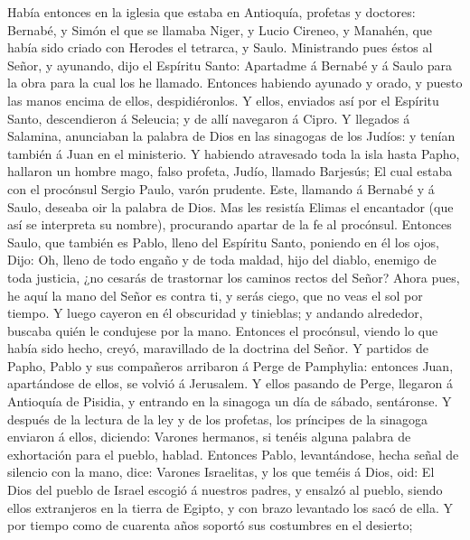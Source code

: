  Había entonces en la iglesia que estaba en Antioquía,
profetas y doctores: Bernabé, y Simón el que se llamaba Niger, y Lucio
Cireneo, y Manahén, que había sido criado con Herodes el tetrarca, y
Saulo.  Ministrando pues éstos al Señor, y ayunando, dijo
el Espíritu Santo: Apartadme á Bernabé y á Saulo para la obra para la
cual los he llamado.  Entonces habiendo ayunado y orado, y
puesto las manos encima de ellos, despidiéronlos.  Y
ellos, enviados así por el Espíritu Santo, descendieron á Seleucia; y de
allí navegaron á Cipro.  Y llegados á Salamina, anunciaban
la palabra de Dios en las sinagogas de los Judíos: y tenían también á
Juan en el ministerio.  Y habiendo atravesado toda la isla
hasta Papho, hallaron un hombre mago, falso profeta, Judío, llamado
Barjesús;  El cual estaba con el procónsul Sergio Paulo,
varón prudente. Este, llamando á Bernabé y á Saulo, deseaba oir la
palabra de Dios.  Mas les resistía Elimas el encantador
(que así se interpreta su nombre), procurando apartar de la fe al
procónsul.  Entonces Saulo, que también es Pablo, lleno
del Espíritu Santo, poniendo en él los ojos,  Dijo: Oh,
lleno de todo engaño y de toda maldad, hijo del diablo, enemigo de toda
justicia, ¿no cesarás de trastornar los caminos rectos del Señor?
 Ahora pues, he aquí la mano del Señor es contra ti, y
serás ciego, que no veas el sol por tiempo. Y luego cayeron en él
obscuridad y tinieblas; y andando alrededor, buscaba quién le condujese
por la mano.  Entonces el procónsul, viendo lo que había
sido hecho, creyó, maravillado de la doctrina del Señor. 
Y partidos de Papho, Pablo y sus compañeros arribaron á Perge de
Pamphylia: entonces Juan, apartándose de ellos, se volvió á Jerusalem.
 Y ellos pasando de Perge, llegaron á Antioquía de
Pisidia, y entrando en la sinagoga un día de sábado, sentáronse.
 Y después de la lectura de la ley y de los profetas, los
príncipes de la sinagoga enviaron á ellos, diciendo: Varones hermanos,
si tenéis alguna palabra de exhortación para el pueblo, hablad.
 Entonces Pablo, levantándose, hecha señal de silencio
con la mano, dice: Varones Israelitas, y los que teméis á Dios, oid:
 El Dios del pueblo de Israel escogió á nuestros padres,
y ensalzó al pueblo, siendo ellos extranjeros en la tierra de Egipto, y
con brazo levantado los sacó de ella.  Y por tiempo como
de cuarenta años soportó sus costumbres en el desierto; 
